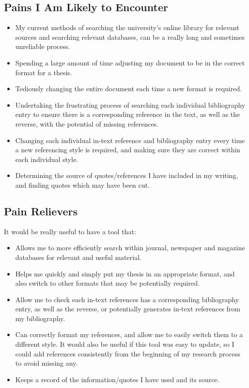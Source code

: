 \documentclass{article}
\begin{document}
\subsection*{Pains I Am Likely to Encounter}
\begin{itemize}
    \item My current methods of searching the university's online library for relevant sources and searching relevant databases, can be a really long and sometimes unreliable process.
    \item Spending a large amount of time adjusting my document to be in the correct format for a thesis.
    \item Tediously changing the entire document each time a new format is required.
    \item Undertaking the frustrating process of searching each individual bibliography entry to ensure there is a corresponding reference in the text, as well as the reverse, with the potential of missing references.
    \item Changing each individual in-text reference and bibliography entry every time a new referencing style is required, and making sure they are correct within each individual style.
    \item Determining the source of quotes/references I have included in my writing, and finding quotes which may have been cut.  
\end{itemize}

\subsection*{Pain Relievers}
It would be really useful to have a tool that:
\begin{itemize}
    \item Allows me to more efficiently search within journal, newspaper and magazine databases for relevant and useful material. 
    \item Helps me quickly and simply put my thesis in an appropriate  format, and also switch to other formats that may be potentially required.
    \item Allow me to check each in-text references has a corresponding bibliography entry, as well as the reverse, or potentially generates in-text references from my bibliography.
    \item Can correctly format my references, and allow me to easily switch them to a different style. It would also be useful if this tool was easy to update, so I could add references consistently from the beginning of my research process to avoid missing any. 
    \item Keeps a record of the information/quotes I have used and its source.
\end{itemize}
\end{document}
